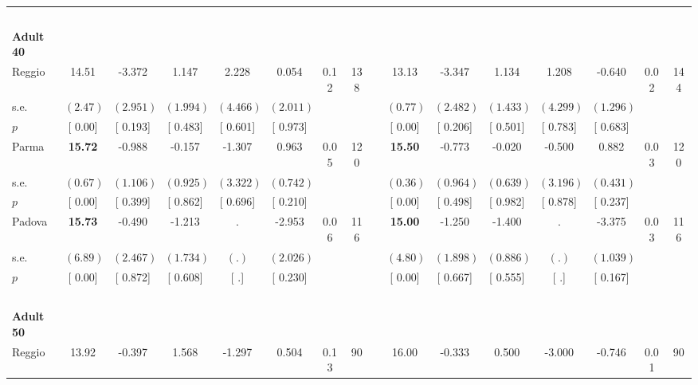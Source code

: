 \begin{longtable}{L{8em} c c c c c c c p{1em} c c c c c c c}
~\\[1em]
\quad \quad \textbf{Adult 40} & & & & & & & & & & & & & & & \\* 
\quad \quad \quad Reggio& 14.51 &    -3.372 &     1.147 &     2.228 &     0.054 &      0.12 &       138 & & 13.13 &    -3.347 &     1.134 &     1.208 &    -0.640 &      0.02 &       144  \\*
\quad \quad \quad \quad s.e.& $ (     2.47)$ & $ (    2.951)$ & $ (    1.994)$ & $ (    4.466)$ & $ (    2.011)$ & & & & $ (     0.77)$ & $ (    2.482)$ & $ (    1.433)$ & $ (    4.299)$ & $ (    1.296)$ & &  \\*
\quad \quad \quad \quad $ p$ & [     0.00] & [    0.193] & [    0.483] & [    0.601] & [    0.973] & & & & [     0.00] & [    0.206] & [    0.501] & [    0.783] & [    0.683] & &  \\[1em]
\quad \quad \quad Parma& \textbf{    15.72} &    -0.988 &    -0.157 &    -1.307 &     0.963 &      0.05 &       120 & & \textbf{    15.50} &    -0.773 &    -0.020 &    -0.500 &     0.882 &      0.03 &       120  \\*
\quad \quad \quad \quad s.e.& $ (     0.67)$ & $ (    1.106)$ & $ (    0.925)$ & $ (    3.322)$ & $ (    0.742)$ & & & & $ (     0.36)$ & $ (    0.964)$ & $ (    0.639)$ & $ (    3.196)$ & $ (    0.431)$ & &  \\*
\quad \quad \quad \quad $ p$ & [     0.00] & [    0.399] & [    0.862] & [    0.696] & [    0.210] & & & & [     0.00] & [    0.498] & [    0.982] & [    0.878] & [    0.237] & &  \\[1em]
\quad \quad \quad Padova& \textbf{    15.73} &    -0.490 &    -1.213 &         . &    -2.953 &      0.06 &       116 & & \textbf{    15.00} &    -1.250 &    -1.400 &         . &    -3.375 &      0.03 &       116  \\*
\quad \quad \quad \quad s.e.& $ (     6.89)$ & $ (    2.467)$ & $ (    1.734)$ & $ (        .)$ & $ (    2.026)$ & & & & $ (     4.80)$ & $ (    1.898)$ & $ (    0.886)$ & $ (        .)$ & $ (    1.039)$ & &  \\*
\quad \quad \quad \quad $ p$ & [     0.00] & [    0.872] & [    0.608] & [        .] & [    0.230] & & & & [     0.00] & [    0.667] & [    0.555] & [        .] & [    0.167] & &  \\[1em]
~\\[1em]
\quad \quad \textbf{Adult 50} & & & & & & & & & & & & & & & \\* 
\quad \quad \quad Reggio& 13.92 &    -0.397 &     1.568 &    -1.297 &     0.504 &      0.13 &        90 & & 16.00 &    -0.333 &     0.500 &    -3.000 &    -0.746 &      0.01 &        90  \\*

\end{longtable}
